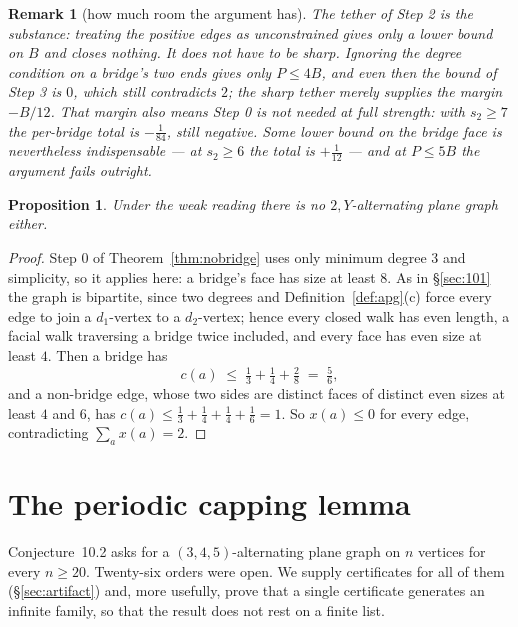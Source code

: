 \documentclass{baustms}
\theoremstyle{cupthm}
\newtheorem{proposition}[theorem]{Proposition}
\theoremstyle{cupdefn}
\theoremstyle{cuprem}
\newtheorem{remark}[theorem]{Remark}
\begin{document}
\begin{remark}[how much room the argument has]
The tether of Step 2 is the substance: treating the positive edges as
unconstrained gives only a lower bound on $B$ and closes nothing. It does not
have to be sharp. Ignoring the degree condition on a bridge's two ends gives
only $P \le 4B$, and even then the bound of Step 3 is $0$, which still
contradicts $2$; the sharp tether merely supplies the margin $-B/12$. That
margin also means Step 0 is not needed at full strength: with $s_2 \ge 7$ the
per-bridge total is $-\tfrac1{84}$, still negative. Some lower bound on the
bridge face is nevertheless indispensable --- at $s_2 \ge 6$ the total is
$+\tfrac1{12}$ --- and at $P \le 5B$ the argument fails outright.
\end{remark}

\begin{proposition}\label{prop:twoY-weak}
Under the weak reading there is no $2,Y$-alternating plane graph either.
\end{proposition}

\begin{proof}
Step 0 of Theorem~\ref{thm:nobridge} uses only minimum degree $3$ and
simplicity, so it applies here: a bridge's face has size at least $8$. As in
\S\ref{sec:101} the graph is bipartite, since two degrees and
Definition~\ref{def:apg}(c) force every edge to join a $d_1$-vertex to a
$d_2$-vertex; hence every closed walk has even length, a facial walk traversing
a bridge twice included, and every face has even size at least $4$. Then a
bridge has
\[
  c(a) \;\le\; \tfrac13 + \tfrac14 + \tfrac28 \;=\; \tfrac56 ,
\]
and a non-bridge edge, whose two sides are distinct faces of distinct even sizes
at least $4$ and $6$, has
$c(a) \le \tfrac13+\tfrac14+\tfrac14+\tfrac16 = 1$. So $x(a) \le 0$ for every
edge, contradicting $\sum_a x(a) = 2$.
\end{proof}

\section{The periodic capping lemma}\label{sec:pumping}

Conjecture~10.2 asks for a $(3,4,5)$-alternating plane graph on $n$ vertices for
every $n \ge 20$. Twenty-six orders were open. We supply certificates for all of
them (\S\ref{sec:artifact}) and, more usefully, prove that a single certificate
generates an infinite family, so that the result does not rest on a finite list.
\end{document}

